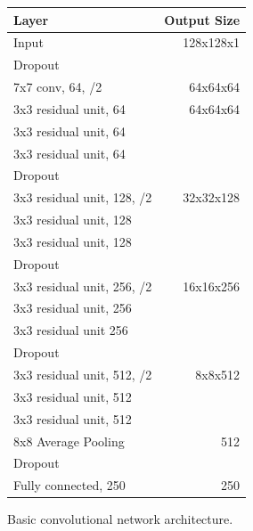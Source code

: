 \documentclass[10pt,twocolumn,letterpaper]{article}
\begin{document}
\begin{figure}[h]
\begin{center}
\begin{tabular}{l | r}
Layer & Output Size \\ \hline \hline
Input	& 128x128x1\\
Dropout &  \\
7x7 conv, 64, /2	 & 64x64x64\\
3x3 residual unit, 64	& 64x64x64\\
3x3 residual unit, 64 & \\
3x3 residual unit, 64	& \\
Dropout	&  \\
3x3 residual unit, 128, /2 & 32x32x128\\
3x3 residual unit, 128 & \\
3x3 residual unit, 128 &\\
Dropout & \\
3x3 residual unit, 256, /2 & 16x16x256\\
3x3 residual unit, 256 & \\
3x3 residual unit 256	 & \\
Dropout	& \\
3x3 residual unit, 512, /2	& 8x8x512\\
3x3 residual unit, 512	&\\
3x3 residual unit, 512& \\
8x8 Average Pooling	& 512\\
Dropout& 	\\
Fully connected, 250	& 250
\end{tabular}
\caption{Basic convolutional network architecture.}
\end{center}
\end{figure}
\end{document}
